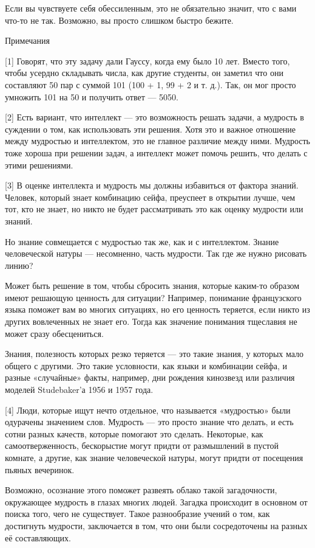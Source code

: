 \documentclass[ebook,12pt,oneside,openany]{memoir}
\begin{document}
Если вы чувствуете себя обессиленным, это не обязательно значит, что с
вами что-то не так. Возможно, вы просто слишком быстро бежите.

Примечания

[1] Говорят, что эту задачу дали Гауссу, когда ему было 10 лет. Вместо
того, чтобы усердно складывать числа, как другие студенты, он заметил
что они составляют 50 пар с суммой 101 (100 + 1, 99 + 2 и т. д.). Так,
он мог просто умножить 101 на 50 и получить ответ — 5050.

[2] Есть вариант, что интеллект — это возможность решать задачи, а
мудрость в суждении о том, как использовать эти решения. Хотя это и
важное отношение между мудростью и интеллектом, это не главное
различие между ними. Мудрость тоже хороша при решении задач, а
интеллект может помочь решить, что делать с этими решениями.

[3] В оценке интеллекта и мудрость мы должны избавиться от фактора
знаний. Человек, который знает комбинацию сейфа, преуспеет в открытии
лучше, чем тот, кто не знает, но никто не будет рассматривать это как
оценку мудрости или знаний.

Но знание совмещается с мудростью так же, как и с интеллектом. Знание
человеческой натуры — несомненно, часть мудрости. Так где же нужно
рисовать линию?

Может быть решение в том, чтобы сбросить знания, которые каким-то
образом имеют решающую ценность для ситуации? Например, понимание
французского языка поможет вам во многих ситуациях, но его ценность
теряется, если никто из других вовлеченных не знает его. Тогда как
значение понимания тщеславия не может сразу обесцениться.

Знания, полезность которых резко теряется — это такие знания, у
которых мало общего с другими. Это такие условности, как языки и
комбинации сейфа, и разные «случайные» факты, например, дни рождения
кинозвезд или различия моделей Studebaker'а 1956 и 1957 года.

[4] Люди, которые ищут нечто отдельное, что называется «мудростью»
были одурачены значением слов. Мудрость — это просто знание что
делать, и есть сотни разных качеств, которые помогают это сделать.
Некоторые, как самоотверженность, бескорыстие могут придти от
размышлений в пустой комнате, а другие, как знание человеческой
натуры, могут придти от посещения пьяных вечеринок.

Возможно, осознание этого поможет развеять облако такой загадочности,
окружающее мудрость в глазах многих людей. Загадка происходит в
основном от поиска того, чего не существует. Такое разнообразие учений
о том, как достигнуть мудрости, заключается в том, что они были
сосредоточены на разных её составляющих.
\end{document}
